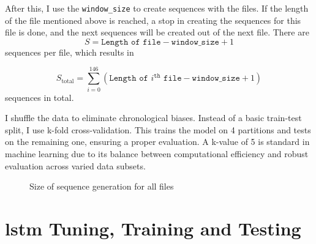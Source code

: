 After this, I use the \texttt{window\_size} to create sequences with the files.
If the length of the file mentioned above is reached, a stop in creating the sequences for this file is done, and the next sequences will be created out of the next file.
There are 
\[S = \texttt{Length of file} - \texttt{window\_size} + 1\] 
sequences per file, which results in 

\[
    S_{\text{total}} = \sum_{i=0}^{146} (\texttt{Length of } i^{\texttt{th}} \texttt{ file} - \texttt{window\_size} + 1)
\]
sequences in total.

I shuffle the data to eliminate chronological biases. 
Instead of a basic train-test split, I use k-fold cross-validation.
This trains the model on 4 partitions and tests on the remaining one, ensuring a proper evaluation.
A k-value of 5 is standard in machine learning due to its balance between computational efficiency and robust evaluation across varied data subsets.

\begin{figure}[h]
    \centering
    
    \caption{Size of sequence generation for all files}
    \label{fig:sequence_generation}
\end{figure}


\section{\ac{lstm} Tuning, Training and Testing}

